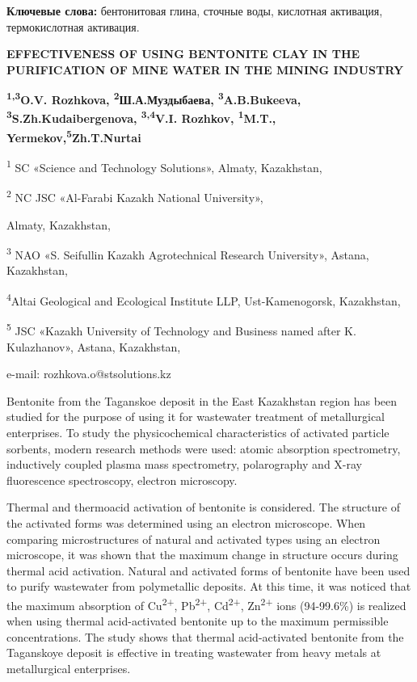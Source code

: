 {\bfseries Ключевые слова:} бентонитовая глина, сточные воды, кислотная
активация, термокислотная активация.

\begin{center}
{\large\bfseries EFFECTIVENESS OF USING BENTONITE CLAY IN THE PURIFICATION OF
MINE WATER IN THE MINING INDUSTRY}

{\bfseries \textsuperscript{1,3}O.V. Rozhkova\envelope, \textsuperscript{2}Ш.А.Муздыбаева, \textsuperscript{3}A.B.Bukeeva, \textsuperscript{3}S.Zh.Kudaibergenova, \textsuperscript{3,4}V.I. Rozhkov, \textsuperscript{1}M.T., Yermekov,\textsuperscript{5}Zh.T.Nurtai}

\textsuperscript{1} SC «Science and Technology Solutions», Almaty,
Kazakhstan,

\textsuperscript{2} NC JSC «Al-Farabi Kazakh National University»,

Almaty, Kazakhstan,

\textsuperscript{3} NAO «S. Seifullin Kazakh Agrotechnical Research
University», Astana, Kazakhstan,

\textsuperscript{4}Altai Geological and Ecological Institute LLP,
Ust-Kamenogorsk, Kazakhstan,

\textsuperscript{5} JSC «Kazakh University of Technology and Business
named after K. Kulazhanov», Astana, Kazakhstan,

e-mail: rozhkova.o@stsolutions.kz
\end{center}

Bentonite from the Taganskoe deposit in the East Kazakhstan region has
been studied for the purpose of using it for wastewater treatment of
metallurgical enterprises. To study the physicochemical characteristics
of activated particle sorbents, modern research methods were used:
atomic absorption spectrometry, inductively coupled plasma mass
spectrometry, polarography and X-ray fluorescence spectroscopy, electron
microscopy.

Thermal and thermoacid activation of bentonite is considered. The
structure of the activated forms was determined using an electron
microscope. When comparing microstructures of natural and activated
types using an electron microscope, it was shown that the maximum change
in structure occurs during thermal acid activation. Natural and
activated forms of bentonite have been used to purify wastewater from
polymetallic deposits. At this time, it was noticed that the maximum
absorption of Cu\textsuperscript{2+}, Pb\textsuperscript{2+},
Cd\textsuperscript{2+}, Zn\textsuperscript{2+} ions (94-99.6\%) is
realized when using thermal acid-activated bentonite up to the maximum
permissible concentrations. The study shows that thermal acid-activated
bentonite from the Taganskoye deposit is effective in treating
wastewater from heavy metals at metallurgical enterprises.

